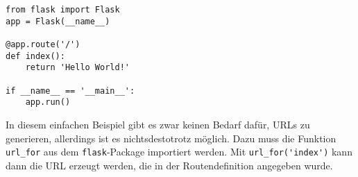 \begin{lstlisting}[caption=Hello World mit Flask,label=lst:simple-flask-app]
from flask import Flask
app = Flask(__name__)

@app.route('/')
def index():
    return 'Hello World!'

if __name__ == '__main__':
    app.run()
\end{lstlisting}

In diesem einfachen Beispiel gibt es zwar keinen Bedarf dafür, URLs zu generieren, allerdings ist es
nichtsdestotrotz möglich. Dazu muss die Funktion \lstinline{url_for} aus dem
\lstinline{flask}-Package importiert werden. Mit \lstinline{url_for('index')} kann dann die URL
erzeugt werden, die in der Routendefinition angegeben wurde.

